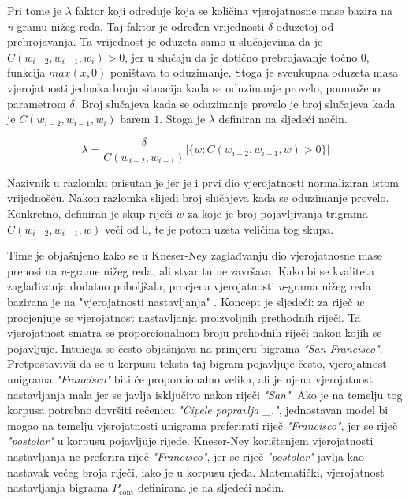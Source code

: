 \documentclass[times, utf8, diplomski, numeric]{fer}
\begin{document}
Pri tome je $\lambda$ faktor koji određuje koja se količina vjerojatnosne mase bazira na \textit{n}-gramu nižeg reda. Taj faktor je određen vrijednosti $\delta$ oduzetoj od prebrojavanja. Ta vrijednost je oduzeta samo u slučajevima da je $C(w_{i - 2}, w_{i - 1}, w_i) > 0$, jer u slučaju da je dotično prebrojavanje točno $0$, funkcija $max(x, 0)$ poništava to oduzimanje. Stoga je sveukupna oduzeta masa vjerojatnosti jednaka broju situacija kada se oduzimanje provelo, pomnoženo parametrom $\delta$. Broj slučajeva kada se oduzimanje provelo je broj slučajeva kada je $C(w_{i - 2}, w_{i - 1}, w_i)$ barem $1$. Stoga je $\lambda$ definiran na sljedeći način.

\[
\lambda = \frac{\delta}{C(w_{i - 2}, w_{i - 1})} \left|\{w : C(w_{i - 2}, w_{i - 1}, w) > 0\}\right|
\]

Nazivnik u razlomku prisutan je jer je i prvi dio vjerojatnosti normaliziran istom vrijednošću. Nakon razlomka slijedi broj slučajeva kada se oduzimanje provelo. Konkretno, definiran je skup riječi $w$ za koje je broj pojavljivanja trigrama $C(w_{i - 2}, w_{i - 1}, w)$ veći od $0$, te je potom uzeta veličina tog skupa.

Time je objašnjeno kako se u Kneser-Ney zaglađvanju dio vjerojatnosne mase prenosi na \textit{n}-grame nižeg reda, ali stvar tu ne završava. Kako bi se kvaliteta zaglađivanja dodatno poboljšala, procjena vjerojatnosti \textit{n}-grama nižeg reda bazirana je na "vjerojatnosti nastavljanja" . Koncept je sljedeći: za riječ $w$ procjenjuje se vjerojatnost nastavljanja proizvoljnih prethodnih riječi. Ta vjerojatnost smatra se proporcionalnom broju prehodnih riječi nakon kojih se pojavljuje. Intuicija se često objašnjava na primjeru bigrama \textit{"San Francisco"}. Pretpostavivši da se u korpusu teksta taj bigram pojavljuje često, vjerojatnost unigrama \textit{"Francisco"} biti će proporcionalno velika, ali je njena vjerojatnost nastavljanja mala jer se javlja isključivo nakon riječi \textit{"San"}. Ako je na temelju tog korpusa potrebno dovršiti rečenicu \textit{"Cipele popravlja \_."}, jednostavan model bi mogao na temelju vjerojatnosti unigrama preferirati riječ \textit{"Francisco"}, jer se riječ \textit{"postolar"} u korpusu pojavljuje rijeđe. Kneser-Ney korištenjem vjerojatnosti nastavljanja ne preferira riječ \textit{"Francisco"}, jer se riječ \textit{"postolar"} javlja kao nastavak većeg broja riječi, iako je u korpusu rjeđa. Matematički, vjerojatnost nastavljanja bigrama $P_{\text{cont}}$ definirana je na sljedeći način.
\end{document}
